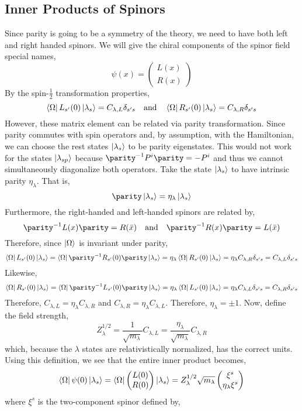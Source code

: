 \documentclass[12pt]{article}
\begin{document}
\subsection{Inner Products of Spinors}
Since parity is going to be a symmetry of the theory, we need to have both left and right handed spinors. We will give the chiral components of the spinor field special names,
\[ \psi(x) = 
\begin{pmatrix}
L(x) \\
R(x)
\end{pmatrix} \]
By the spin-$\tfrac{1}{2}$ transformation properties,
\[ \left< \Omega \right| L_{s'}(0) \left| \lambda_{s} \right> = C_{\lambda, L} \delta_{s' s} \quad \text{and} \quad \left< \Omega \right| R_{s'}(0) \left| \lambda_{s} \right> = C_{\lambda, R} \delta_{s' s}\]
However, these matrix element can be related via parity transformation. Since parity commutes with spin operators and, by assumption, with the Hamiltonian, we can choose the rest states $\left| \lambda_s \right>$ to be parity eigenstates. This would not work for the states $\left| \lambda_{sp} \right>$ because $\parity^{-1} P^i \parity = - P^i$ and thus we cannot simultaneously diagonalize both operators. Take the state $\left| \lambda_s \right>$ to have intrinsic parity $\eta_\lambda$. That is,
\[ \parity \ket{\lambda_s} = \eta_\lambda \ket{\lambda_s} \]
Furthermore, the right-handed and left-handed spinors are related by,
\[ \parity^{-1} L(x) \parity = R(\bar{x}) \quad \text{and} \quad \parity^{-1} R(x) \parity = L(\bar{x}) \]
Therefore, since $\left| \Omega \right>$ is invariant under parity,
\[ \bra{\Omega} L_{s'}(0) \ket{\lambda_{s}} = \bra{\Omega} \parity^{-1} R_{s'}(0) \parity  \ket{\lambda_{s}} = \eta_\lambda \bra{\Omega} R_{s'}(0) \ket{\lambda_{s}} = \eta_\lambda C_{\lambda, R} \delta_{s's} = C_{\lambda, L} \delta_{s's} \]
Likewise,
\[ \bra{\Omega} R_{s'}(0) \ket{\lambda_{s}} = \bra{\Omega} \parity^{-1} L_{s'}(0) \parity  \ket{\lambda_{s}} = \eta_\lambda \bra{\Omega} L_{s'}(0) \ket{\lambda_{s}} = \eta_\lambda C_{\lambda, L} \delta_{s's} = C_{\lambda, R} \delta_{s's} \]
Therefore, $C_{\lambda, L} = \eta_{\lambda} C_{\lambda, R}$ and $C_{\lambda, R} = \eta_{\lambda} C_{\lambda, L}$. Therefore, $\eta_{\lambda} = \pm 1$. Now, define the field strength,
\[ Z_{\lambda}^{1/2} = \frac{1}{\sqrt{m_\lambda}} C_{\lambda, L} = \frac{\eta_\lambda}{\sqrt{m_\lambda}}  C_{\lambda, R} \]
which, because the $\lambda$ states are relativistically normalized, has the correct units.
Using this definition, we see that the entire inner product becomes,
\[ \left< \Omega \right| \psi(0) \left| \lambda_s \right> = \left< \Omega \right|
\begin{pmatrix}
L(0) \\
R(0)
\end{pmatrix} \left| \lambda_s \right> = Z_{\lambda}^{1/2} \sqrt{m_\lambda} 
\begin{pmatrix}
\xi^s \\
\eta_\lambda \xi^s
\end{pmatrix} \]
where $\xi^s$ is the two-component spinor defined by,
\end{document}
